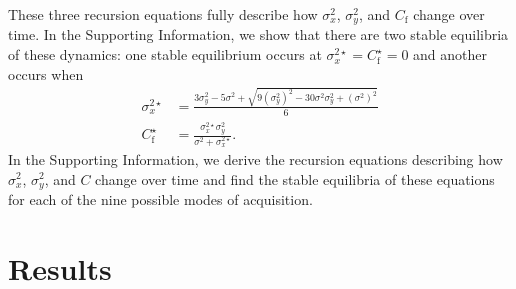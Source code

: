 \documentclass{article}
\newcommand{\x}[1]{\text{#1}}
\begin{document}
These three recursion equations fully describe how $\sigma_x^2$, $\sigma_y^2$, and $C_\x{f}$ change over time. In the Supporting Information, we show that there are two stable equilibria of these dynamics: one stable equilibrium occurs at $\sigma_x^{2\star}=C_\x{f}^\star=0$ and another occurs when
\begin{align*}
\sigma_x^{2\star}&=\frac{3\sigma_y^2-5\sigma^2+\sqrt{9(\sigma_y^2)^2-30\sigma^2\sigma_y^2+(\sigma^2)^2}}{6}
\\ C_\x{f}^\star&=\frac{\sigma_x^{2\star}\sigma_y^2}{\sigma^2+\sigma_x^{2\star}}.
\end{align*}
In the Supporting Information, we derive the recursion equations describing how $\sigma_x^2$, $\sigma_y^2$, and $C$ change over time and find the stable equilibria of these equations for each of the nine possible modes of acquisition.

\section*{Results}
\end{document}
